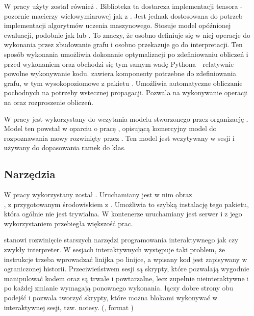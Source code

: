 W pracy użyty został również . Biblioteka ta dostarcza
implementacji tensora - pozornie macierzy wielowymiarowej jak z . Jest jednak
dostosowana do potrzeb implementacji algorytmów uczenia maszynowego. Stosuje model opóźnionej
ewaluacji, podobnie jak  lub . To znaczy, że
osobno definiuje się w niej operacje do wykonania przez zbudowanie grafu i osobno przekazuje go do interpretacji.
Ten sposób wykonania umożliwia dokonanie optymalizacji po zdefiniowaniu obliczeń i przed wykonaniem oraz
obchodzi się tym samym wadę Pythona - relatywnie powolne wykonywanie kodu.
 zawiera komponenty potrzebne do zdefiniowania grafu, w tym wysokopoziomowe
z pakietu . Umożliwia automatyczne obliczanie pochodnych na potrzeby wstecznej propagacji.
Pozwala na wykonywanie operacji na  oraz rozproszenie obliczeń.

W pracy  jest wykorzystany do wczytania modelu stworzonego przez organizację .
Model ten powstał w oparciu o pracę \cite{deepSpeechScaling},
opisującą komercyjny model do rozpoznawania mowy rozwinięty przez .
Ten model jest wczytywany w sesji  i używany do dopasowania ramek do klas.

\subsection{Narzędzia}

W pracy wykorzystany został . Uruchamiany jest w nim obraz \\ ,
z przygotowanym środowiskiem z . Umożliwia to szybką instalację tego pakietu, która ogólnie nie
jest trywialna. W kontenerze uruchamiany jest serwer  i z jego wykorzystaniem przebiegła większość prac.

 stanowi rozwinięcie starszych narzędzi programowania interaktywnego jak  czy zwykły  interpreter. W sesjach interaktywnych występuje taki problem, że instrukcje trzeba wprowadzać linijka po linijce, a wpisany kod jest zapisywany w ograniczonej historii. Przeciwieństwem sesji są skrypty, które pozwalają wygodnie manipulować
kodem oraz są trwałe i powtarzalne, lecz zupełnie nieinteraktywne i po każdej zmianie wymagają ponownego wykonania.
 łączy dobre strony obu podejść i pozwala tworzyć skrypty, które można blokami wykonywać
w interaktywnej sesji, tzw. notesy. (, format )

